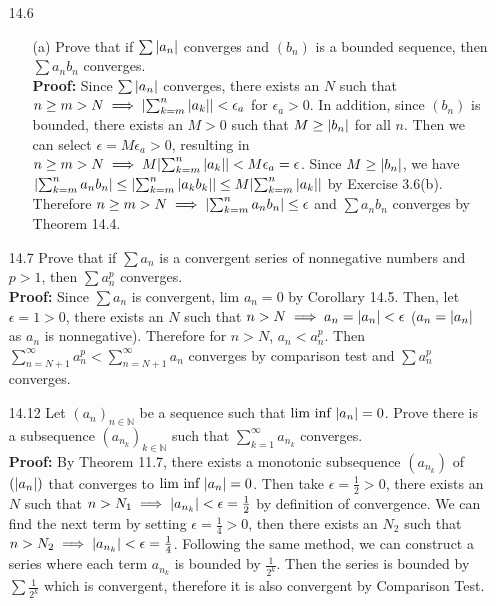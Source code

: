 \documentclass{article}
\begin{document}
\begin{itemize}
\begin{itemize}
          \end{itemize}
    \item [14.6]
          \begin{itemize}
              \item [(a)] Prove that if $\sum\abs{a_n}$ converges and $(b_n)$ is a bounded sequence, then $\sum a_nb_n$ converges.\\\textbf{Proof: } Since $\sum\abs{a_n}$ converges, there exists an $N$ such that $n\geq m>N\implies\abs{\sum_{k=m}^n \abs{a_k}}<\epsilon_a$ for $\epsilon_a>0$. In addition, since $(b_n)$ is bounded, there exists an $M>0$ such that $M\geq\abs{b_n}$ for all $n$. Then we can select $\epsilon=M\epsilon_a>0$, resulting in $n\geq m>N\implies M\abs{\sum_{k=m}^n \abs{a_k}}<M\epsilon_a=\epsilon$. Since $M\geq\abs{b_n}$, we have $\abs{\sum_{k=m}^n a_nb_n}\leq\abs{\sum_{k=m}^n \abs{a_kb_k}}\leq M\abs{\sum_{k=m}^n \abs{a_k}}$ by Exercise 3.6(b). Therefore $n\geq m>N\implies\abs{\sum_{k=m}^n a_nb_n}\leq\epsilon$ and $\sum a_nb_n$ converges by Theorem 14.4.
          \end{itemize}
    \item [14.7] Prove that if $\sum a_n$ is a convergent series of nonnegative numbers and $p>1$, then $\sum a_n^p$ converges.\\\textbf{Proof: } Since $\sum a_n$ is convergent, $\text{lim }a_n=0$ by Corollary 14.5. Then, let $\epsilon=1>0$, there exists an $N$ such that $n>N\implies a_n=\abs{a_n}<\epsilon$ ($a_n=\abs{a_n}$ as $a_n$ is nonnegative). Therefore for $n>N$, $a_n<a_n^p$. Then $\sum_{n=N+1}^\infty a_n^p<\sum_{n=N+1}^\infty a_n$ converges by comparison test and $\sum a_n^p$ converges.
    \item [14.12] Let $(a_n)_{n\in\mathbb{N}}$ be a sequence such that $\text{lim inf }\abs{a_n}=0$. Prove there is a subsequence $(a_{n_k})_{k\in\mathbb{N}}$ such that $\sum_{k=1}^\infty a_{n_k}$ converges.\\\textbf{Proof: } By Theorem 11.7, there exists a monotonic subsequence $(a_{n_k})$ of $(\abs{a_n})$ that converges to $\text{lim inf }\abs{a_n}=0$. Then take $\epsilon=\frac{1}{2}>0$, there exists an $N$ such that $n>N_1\implies\abs{a_{n_k}}<\epsilon=\frac{1}{2}$ by definition of convergence. We can find the next term by setting $\epsilon=\frac{1}{4}>0$, then there exists an $N_2$ such that $n>N_2\implies\abs{a_{n_k}}<\epsilon=\frac{1}{4}$. Following the same method, we can construct a series where each term $a_{n_k}$ is bounded by $\frac{1}{2^k}$. Then the series is bounded by $\sum\frac{1}{2^k}$ which is convergent, therefore it is also convergent by Comparison Test.

\end{itemize}
\end{document}
